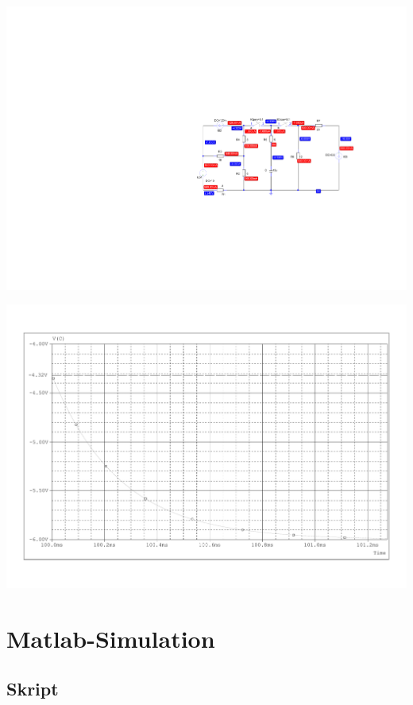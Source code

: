 \documentclass[11pt]{scrartcl}
\begin{document}
\begin{center}
  \includegraphics[scale=1.3]{./Assets/gesamter Schaltvorgang.pdf}
  \label{fig:umschalt}
\end{center}

\begin{center}
  \includegraphics[width=0.8\linewidth]{./Assets/PS_SV.pdf}
  \label{fig:umschalt}
\end{center}


\newpage
\section{Matlab-Simulation}
\subsection{Skript}

\end{document}
